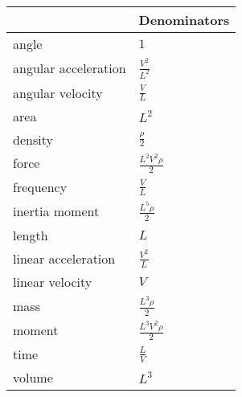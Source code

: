 \documentclass[review]{elsarticle}
\begin{document}
\begin{savenotes}\sphinxattablestart
\centering
{}
\sphinxthecaptionisattop
{}\label{\detokenize{02.01_VMMs:prime-system-denominators}}
 \sphinxaftertopcaption
 \begin{tabulary}{\linewidth}[t]{|T|T|}
 \hline
 \sphinxstyletheadfamily &\sphinxstyletheadfamily 
  
 Denominators
 \\
 \hline
  
 angle
 &
  
 \(1\)
 \\
 \hline
  
 angular
 acceleration
 &
  
 \(\frac{V^{2}}{L^{2}}\)
 \\
 \hline
  
 angular
 velocity
 &
  
 \(\frac{V}{L}\)
 \\
 \hline
  
 area
 &
  
 \(L^{2}\)
 \\
 \hline
  
 density
 &
  
 \(\frac{\rho}{2}\)
 \\
 \hline
  
 force
 &
  
 \(\frac{L^{2} V^{2} \rho}{2}\)
 \\
 \hline
  
 frequency
 &
  
 \(\frac{V}{L}\)
 \\
 \hline
  
 inertia
 moment
 &
  
 \(\frac{L^{5} \rho}{2}\)
 \\
 \hline
  
 length
 &
  
 \(L\)
 \\
 \hline
  
 linear
 acceleration
 &
  
 \(\frac{V^{2}}{L}\)
 \\
 \hline
  
 linear
 velocity
 &
  
 \(V\)
 \\
 \hline
  
 mass
 &
  
 \(\frac{L^{3} \rho}{2}\)
 \\
 \hline
  
 moment
 &
  
 \(\frac{L^{3} V^{2} \rho}{2}\)
 \\
 \hline
  
 time
 &
  
 \(\frac{L}{V}\)
 \\
 \hline
  
 volume
 &
  
 \(L^{3}\)
 \\
 \hline
 \end{tabulary}
 \par
 \sphinxattableend\end{savenotes}
\end{document}
